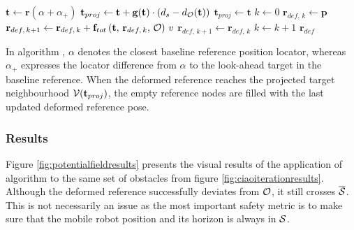\begin{algorithm}[H]
	\caption{\footnotesize \textsc{GETDEFORMEDREF}}\label{alg:gendeformedref}
	\centering
	\footnotesize
	\begin{algorithmic}[1]
	\State $\mathbf{t}\gets\mathbf{r}\left(\alpha+\alpha_+\right)$ 
		\State $\mathbf{t}_{proj} \gets \mathbf{t} + \mathbf{g}(\mathbf{t}) \cdot \left(d_s - d_{\mathcal{O}}(\mathbf{t})\right)$ 
	\Else	
		\State $\mathbf{t}_{proj}\gets\mathbf{t}$
	\EndIf
	\State $k \gets 0$
	\State $\mathbf{r}_{def,\,k} \gets\mathbf{p}$
		 
			\State $\mathbf{r}_{def,\,k + 1} \gets \mathbf{r}_{def,\,k} + \mathbf{f}_{tot}\left(\mathbf{t},\,\mathbf{r}_{def,\,k},\,\mathcal{O}\right)\,v$ 
		\Else
			\State $\mathbf{r}_{def,\,k + 1} \gets \mathbf{r}_{def,\,k}$ 
		\EndIf
		\State $k \gets k+1$	
	\EndWhile
	\State \Return $\mathbf{r}_{def}$
	\EndFunction
	\end{algorithmic}
\end{algorithm}

In algorithm , $\alpha$ denotes the closest baseline reference position locator, whereas $\alpha_+$ expresses the locator difference from $\alpha$ to the look-ahead target in the baseline reference. When the deformed reference reaches the projected target neighbourhood $\mathcal{V}(\mathbf{t}_{proj})$, the empty reference nodes are filled with the last updated deformed reference pose.

\subsubsection*{Results}

Figure \ref{fig:potentialfieldresults} presents the visual results of the application of algorithm  to the same set of obstacles from figure \ref{fig:ciaoiterationresults}. Although the deformed reference successfully deviates from $\mathcal{O}$, it still crosses $\overline{\mathcal{S}}$. This is not necessarily an issue as the most important safety metric is to make sure that the mobile robot position and its horizon is always in $\mathcal{S}$.

